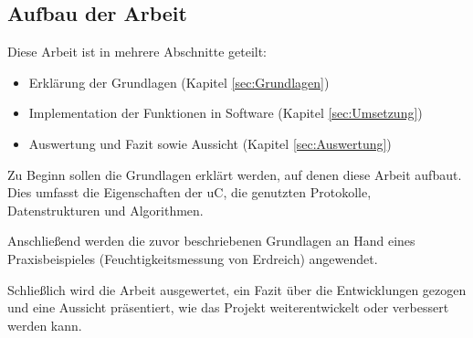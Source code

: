 \subsection{Aufbau der Arbeit}

Diese Arbeit ist in mehrere Abschnitte geteilt:

\begin{itemize}
    \item Erklärung der Grundlagen (Kapitel \ref{sec:Grundlagen})
    \item Implementation der Funktionen in Software (Kapitel \ref{sec:Umsetzung})
    \item Auswertung und Fazit sowie Aussicht (Kapitel \ref{sec:Auswertung})
\end{itemize}

Zu Beginn sollen die Grundlagen erklärt werden, auf denen diese Arbeit aufbaut. Dies umfasst die Eigenschaften
der \ac{uC}, die genutzten Protokolle, Datenstrukturen und Algorithmen.

Anschließend werden die zuvor beschriebenen Grundlagen an Hand eines Praxisbeispieles (Feuchtigkeitsmessung von Erdreich) angewendet.

Schließlich wird die Arbeit ausgewertet, ein Fazit über die Entwicklungen gezogen und eine Aussicht präsentiert, wie das Projekt
weiterentwickelt oder verbessert werden kann. 